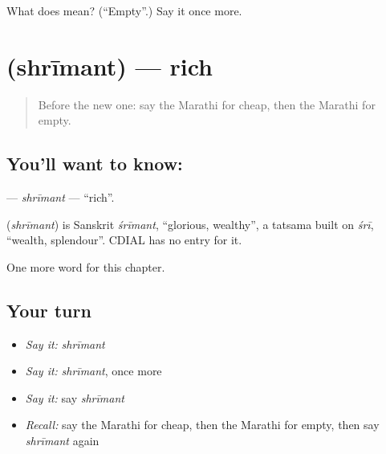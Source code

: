 \begin{tcolorbox}[breakable,colback=teal!4,colframe=teal!35!black,title={Before you move on}]
What does  mean? (\textquotedblleft{}Empty\textquotedblright{}.) Say it once more.
\end{tcolorbox}
\section[\texorpdfstring{\mr{श्रीमंत} (shrīmant)}{श्रीमंत (shrīmant)}]{ (shrīmant) — rich}

\label{lesson:MR-C105-shrimant}



\begin{quote}
Before the new one: say the Marathi for cheap, then the Marathi for empty.
\end{quote}

\subsection*{You'll want to know: }
\textbf{} — \emph{shrīmant} — \textquotedblleft{}rich\textquotedblright{}.

\begin{cousinweb}
\textbf{} (\emph{shrīmant}) is Sanskrit \emph{śrīmant}, \textquotedblleft{}glorious, wealthy\textquotedblright{}, a tatsama built on \emph{śrī}, \textquotedblleft{}wealth, splendour\textquotedblright{}. CDIAL has no entry for it.
\end{cousinweb}

\begin{grammarlens}[title={What you've built}]
One more word for this chapter.
\end{grammarlens}

\subsection*{Your turn}
\begin{itemize}
\raggedright
  \item \emph{Say it:} \emph{shrīmant}
  \item \emph{Say it:} \emph{shrīmant}, once more
  \item \emph{Say it:} say \emph{shrīmant}
  \item \emph{Recall:} say the Marathi for cheap, then the Marathi for empty, then say \emph{shrīmant} again
\end{itemize}

